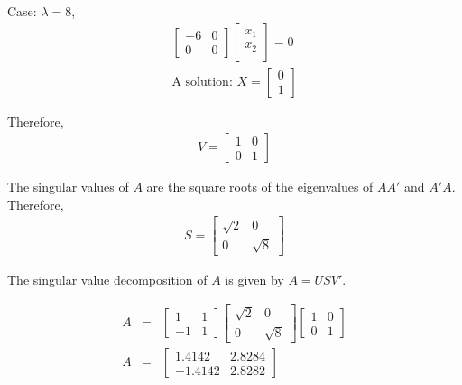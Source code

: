 Case: \(\lambda = 8 \),
\begin{eqnarray}
  \begin{bmatrix}
    -6 & 0 \\
    0 & 0
  \end{bmatrix}
  \begin{bmatrix}
    x_1 \\
    x_2 \\
  \end{bmatrix}
  = 0 \\
  \text{A solution: }
  X = 
  \begin{bmatrix}
    0 \\
    1
  \end{bmatrix}
\end{eqnarray}

Therefore,
\begin{eqnarray}
  V = 
  \begin{bmatrix}
    1 & 0 \\
    0 & 1
  \end{bmatrix}
\end{eqnarray}

The singular values of \(A\) are the square roots of the eigenvalues of \(AA'\) and \(A'A\).
Therefore,
\begin{eqnarray}
  S = 
  \begin{bmatrix}
    \sqrt{2} & 0 \\
    0 & \sqrt{8}
  \end{bmatrix}
\end{eqnarray}

The singular value decomposition of \(A\) is given by \(A = USV'\).

\begin{eqnarray}
  A &=& 
  \begin{bmatrix}
    1 & 1 \\
    -1 & 1
  \end{bmatrix}
  \begin{bmatrix}
    \sqrt{2} & 0 \\
    0 & \sqrt{8}
  \end{bmatrix}
  \begin{bmatrix}
    1 & 0 \\
    0 & 1
  \end{bmatrix}
  \\
  A &=&
  \begin{bmatrix}
    1.4142 & 2.8284 \\
    -1.4142 & 2.8282
  \end{bmatrix}
\end{eqnarray}

